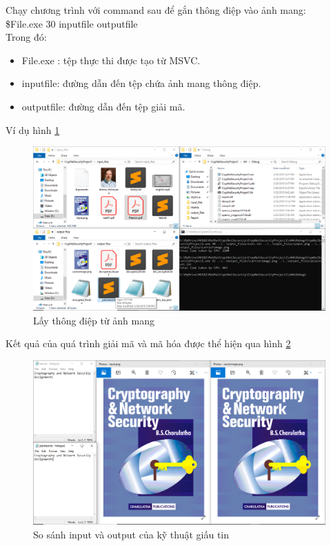 \documentclass[a4paper]{article}
\begin{document}
    Chạy chương trình với command sau để gắn thông điệp vào ảnh mang:\\
    \$File.exe 30 inputfile outputfile\\
    Trong đó:
    \begin{itemize}
        \item File.exe : tệp thực thi được tạo từ MSVC.
        \item inputfile: đường dẫn đến tệp chứa ảnh mang thông điệp.
        \item outputfile: đường dẫn đến tệp giải mã.
    \end{itemize}
    Ví dụ hình \ref{fig:stede}
    \begin{figure}[htp]
        \centering
        \includegraphics[scale=0.4]{stede.png}
        \caption{Lấy thông điệp từ ảnh mang}
        \label{fig:stede}
    \end{figure}

    Kết quả của quá trình giải mã và mã hóa được thể hiện qua hình \ref{fig:stecmp}
    \begin{figure}[htp]
        \centering
        \includegraphics[scale=0.4]{stecmp.png}
        \caption{So sánh input và output của kỹ thuật giấu tin}
        \label{fig:stecmp}
    \end{figure}
\end{document}
